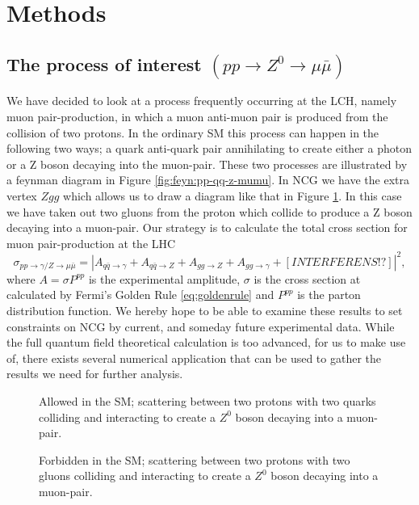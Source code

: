 \section{Methods}

\subsection{The process of interest $(pp \rightarrow Z^0 \rightarrow \mu \bar\mu)$}
We have decided to look at a process frequently occurring at the LCH, namely muon pair-production, in which a muon anti-muon pair is produced from the collision of two protons. In the ordinary SM this process can happen in the following two ways; a quark anti-quark pair annihilating to create either a photon or a Z boson decaying into the muon-pair. These two processes are illustrated by a feynman diagram in Figure \ref{fig:feyn:pp-qq-z-mumu}. In NCG we have the extra vertex $Zgg$ which allows us to draw a diagram like that in Figure \ref{fig:feyn:pp-gg-z-mumu}. In this case we have taken out two gluons from the proton which collide to produce a Z boson decaying into a muon-pair. Our strategy is to calculate the total cross section for muon pair-production at the LHC
\begin{equation}
	\sigma_{pp \rightarrow \gamma/ Z \rightarrow \mu \bar \mu} = |A_{q \bar q \rightarrow \gamma} + A_{q \bar q \rightarrow Z} + A_{gg \rightarrow Z} + A_{gg \rightarrow \gamma} + [INTERFERENS!?]|^{2},
\end{equation}
where $A = \sigma P^{pp}$ is the experimental amplitude, $\sigma$ is the cross section at calculated by Fermi's Golden Rule \eqref{eq:goldenrule} and $P^{pp}$ is the parton distribution function. We hereby hope to be able to examine these results to set constraints on NCG by current, and someday future experimental data. While the full quantum field theoretical calculation is too advanced, for us to make use of, there exists several numerical application that can be used to gather the results we need for further analysis.

\begin{figure}[htp]
	\centering
	\begin{minipage}[b]{0.475\linewidth}
    \centering
	  
	  \caption{Allowed in the SM; scattering between two protons with two quarks colliding and interacting to create a $Z^0$ boson decaying into a muon-pair.} 
	  \label{fig:feyn:pp-qq-z-mumu}
	\end{minipage}
	\hspace{0.5cm}
	\begin{minipage}[b]{0.475\linewidth}
    \centering
	  
	  \caption{Forbidden in the SM; scattering between two protons with two gluons colliding and interacting to create a $Z^0$ boson decaying into a muon-pair.} %
	  \label{fig:feyn:pp-gg-z-mumu}
	\end{minipage}
\end{figure}

